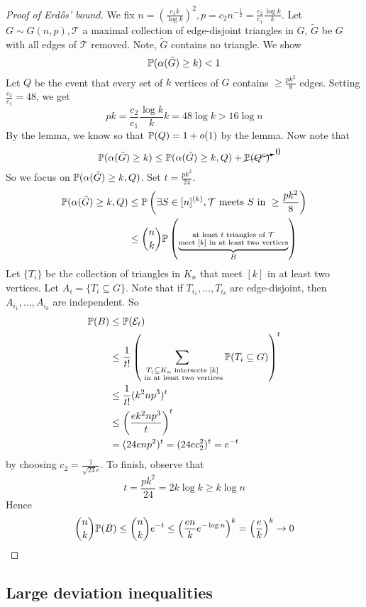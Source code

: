 \documentclass{article}
\begin{document}
\begin{proof}[Proof of Erd\H os' bound]
  We fix $n = \left(\frac{c_1 k}{\log k}\right)^2, p = c_2n^{-\frac 12} = \frac{c_2}{c_1}\frac{\log k}k$. Let $G \sim G(n, p), \mathcal T$ a maximal collection of edge-disjoint triangles in $G$, $\tilde G$ be $G$ with all edges of $\mathcal T$ removed. Note, $\tilde G$ contains no triangle. We show
  $$\P(\alpha(\tilde G) \ge k) < 1$$
  Let $Q$ be the event that every set of $k$ vertices of $G$ contains $\ge \frac{pk^2}8$ edges. Setting $\frac{c_2}{c_1} = 48$, we get
  $$pk = \frac{c_2}{c_1}\frac{\log k}k k = 48\log k > 16\log n$$ By the lemma, we know so that $\P(Q) = 1 + o(1)$ by the lemma. Now note that
  $$\P(\alpha(\tilde G) \ge k) \le \P(\alpha(\tilde G) \ge k, Q) + \cancelto 0{\P(Q^c)}$$
  So we focus on $\P(\alpha(\tilde G) \ge k, Q)$. Set $t = \frac{pk^2}{24}$.
  \begin{align*}
    \P(\alpha(\tilde G) \ge k, Q)
    & \le \P\left(\exists S \in [n]^{(k)}, \mathcal T \text{ meets $S$ in } \ge \frac{pk^2}8\right) \\
    & \le \binom n k \P\left(\underbrace{\substack{\text{at least $t$ triangles of $\mathcal T$} \\ \text{meet $[k]$ in at least two vertices}}}_B\right)
  \end{align*}
  Let $\{T_i\}$ be the collection of triangles in $K_n$ that meet $[k]$ in at least two vertices. Let $A_i = \{T_i \subseteq G\}$. Note that if $T_{i_1}, \dots, T_{i_k}$ are edge-disjoint, then $A_{i_1}, \dots, A_{i_k}$ are independent. So
  \begin{align*}
    \P(B)
    & \le \P(\Eps_t) \\
    & \le \frac 1{t!}\left(\sum_{\substack{T_i \subseteq K_n \text{ intersects } [k] \\ \text{ in at least two vertices}}} \P(T_i \subseteq G)\right)^t \\
    & \le \frac 1{t!} (k^2np^3)^t \\
    & \le \left(\frac{ek^2np^3}t\right)^t \\
    & = (24enp^2)^t = (24ec_2^2)^t = e^{-t}
  \end{align*}
  by choosing $c_2 = \frac 1{\sqrt{24} e}$. To finish, observe that
  $$t = \frac{pk^2}{24} = 2k\log k \ge k\log n$$
  Hence
  $$\binom n k \P(B) \le \binom n k e^{-t} \le \left(\frac{en}k e^{-\log n}\right)^k = \left(\frac ek\right)^k \mor 0$$
\end{proof}


\subsection{Large deviation inequalities}
\end{document}
